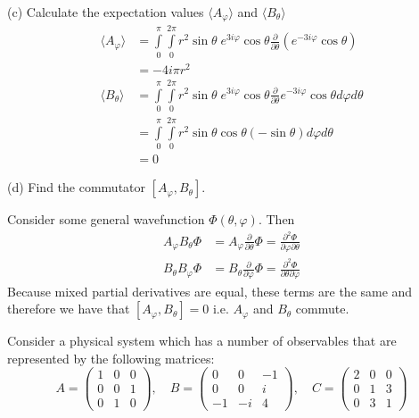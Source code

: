 \documentclass[a4paper, 11pt]{article}
\newcommand{\expect}[1]{\langle #1 \rangle}
\newenvironment{solution}{%
	\begin{list}{}{%
			\setlength{\topsep}{0pt}%
			\setlength{\leftmargin}{1.5cm}%
			\setlength{\rightmargin}{1.5cm}%
			\setlength{\listparindent}{\parindent}%
			\setlength{\itemindent}{\parindent}%
			\setlength{\parsep}{\parskip}%
		}%
		\item[]}{\end{list}}
\begin{document}
\noindent (c) Calculate the expectation values $\expect{A_\varphi}$ and $\expect{B_\theta}$ 
	\begin{align*}
		\expect{A_\varphi} &= \int\limits_0^\pi\int\limits_0^{2\pi}r^2\sin\theta\; e^{3i\varphi}\cos\theta \frac{\partial}{\partial \theta}\left( e^{-3i\varphi}\cos\theta \right) \\ 
			&= -4i\pi r^2 \\ 
		\expect{B_\theta} &= \int\limits_0^\pi\int\limits_0^{2\pi}r^2\sin\theta\; e^{3i\varphi}\cos\theta \frac{\partial}{\partial \theta} e^{-3i\varphi}\cos\theta d\varphi d\theta \\ 
			&= \int\limits_0^\pi\int\limits_0^{2\pi}r^2\sin\theta\cos\theta(-\sin\theta)d\varphi d\theta \\ 
			&= 0
	\end{align*} 
	
\noindent (d) Find the commutator $[A_\varphi, B_\theta]$. \\
	\begin{solution}
		\noindent Consider some general wavefunction $\Phi(\theta, \varphi)$. Then 
			\begin{align*}
				A_\varphi B_\theta \Phi &= A_\varphi \frac{\partial}{\partial \theta}\Phi = \frac{\partial^2 \Phi}{\partial \varphi \partial \theta} \\ 
				B_\theta B_\varphi \Phi &= B_\theta \frac{\partial}{\partial \varphi}\Phi = \frac{\partial^2 \Phi}{\partial\theta \partial\varphi}
			\end{align*}
		Because mixed partial derivatives are equal, these terms are the same and therefore we have that $[A_\varphi, B_\theta]=0$ i.e. $A_\varphi$ and $B_\theta$ commute. \\
	\end{solution}

\noindent Consider a physical system which has a number of observables that are represented by the following matrices:
	\begin{equation*}
		A = \begin{pmatrix}1 & 0 & 0 \\ 0 & 0 & 1 \\ 0 & 1 & 0\end{pmatrix}, \quad B = \begin{pmatrix}0 & 0 & -1 \\ 0 & 0 & i \\ -1 & -i & 4\end{pmatrix}, \quad C = \begin{pmatrix}2 & 0 & 0 \\ 0 & 1 & 3 \\ 0 & 3 & 1\end{pmatrix}
	\end{equation*}
	
\end{document}
